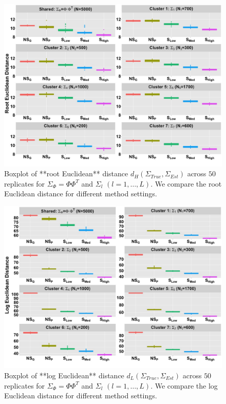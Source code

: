 \documentclass[
]{book}
\begin{document}
\begin{figure}

{\centering \includegraphics[width=0.8\linewidth]{images/Root_Euclidean_plot} 

}

\caption{Boxplot of **root Euclidean** distance $d_{H}(\Sigma_{True}, \Sigma_{Est})$ across  $50$ replicates for $\Sigma_{\Phi} = \Phi \Phi^{T}$ and $\Sigma_{l}$ $(l = 1, \dots , L)$. We compare the root Euclidean distance for different method settings.}\label{fig:RootEuclid}
\end{figure}

\begin{figure}

{\centering \includegraphics[width=0.8\linewidth]{images/Log_Euclidean_plot} 

}

\caption{Boxplot of **log Euclidean** distance $d_{L}( \Sigma_{True}, \Sigma_{Est})$ across  $50$ replicates for $\Sigma_{\Phi} = \Phi \Phi^{T}$ and $\Sigma_{l}$ $(l = 1, \dots , L)$. We compare the log Euclidean distance for different method settings.}\label{fig:LogEuclid}
\end{figure}
\end{document}
